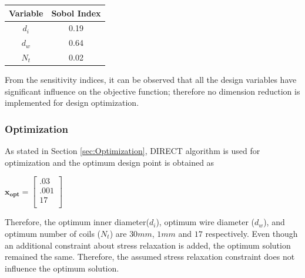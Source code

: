 \documentclass[10pt]{article}
\begin{document}
		 \begin{center}
	 \begin{tabular}{| c  | c |  }
	 	\hline Variable & Sobol Index\\
	 	\hline $d_{i}$ & 0.19 \\
		\hline $d_{w}$ & 0.64  \\
		\hline $N_{t}$ & 0.02 \\ 
		\hline
	 \end{tabular}
\end{center}

From the sensitivity indices, it can be observed that all the design variables have significant influence on the objective function; therefore no dimension reduction is implemented for design optimization. 


\subsubsection{Optimization}
	
	As stated in Section \ref{sec:Optimization}, DIRECT algorithm is used for optimization and the optimum design point is obtained as 
	\begin{center}
	$\mathbf{x_{opt}} =
	\left[
	\begin{array}{c}
	 	 .03 \\
	 	 .001 \\
		 17    \\ 
		
	 \end{array}
	 \right]
$	
\end{center}
    Therefore, the optimum inner diameter($d_{i}$), optimum wire diameter ($d_{w}$), and optimum number of coils ($N_{t}$) are $30 mm$, $1 mm$ and $17$ respectively. Even though an additional constraint about stress relaxation is added, the optimum solution remained the same. Therefore, the assumed stress relaxation constraint does not influence the optimum solution.
    
    
\end{document}
